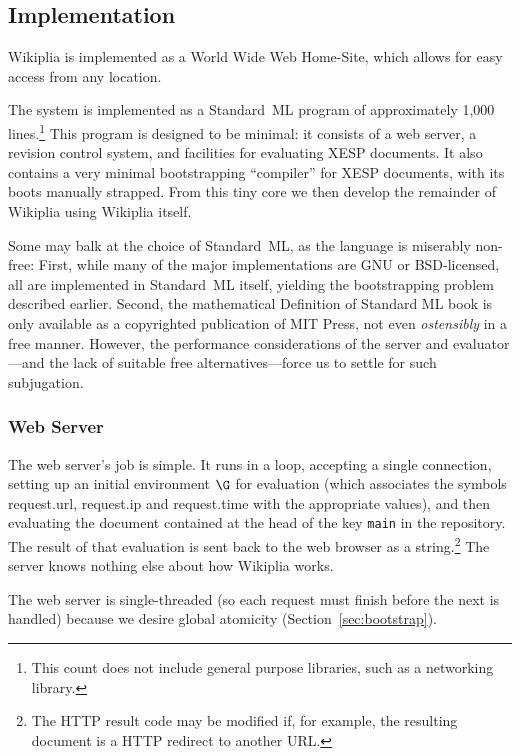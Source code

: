 \documentclass[twocolumn]{article}
\begin{document}
\subsection{Implementation}

Wikiplia is implemented as a World Wide Web Home-Site, which allows
for easy access from any location.

The system is implemented as a Standard~ML program
of approximately 1,000 lines.\z\footnote{This count does not include
general purpose libraries, such as a networking library.} This program
is designed to be minimal: it consists of a web server, a revision
control system, and facilities for evaluating XESP documents. It also
contains a very minimal bootstrapping ``compiler'' for XESP documents,
with its boots manually strapped. From this tiny core we then develop
the remainder of Wikiplia using Wikiplia itself.

Some may balk at the choice of Standard~ML, as the language is
miserably non-free: First, while many of the major implementations are
GNU or BSD-licensed,\z{} all are implemented in
Standard~ML itself, yielding the bootstrapping problem described
earlier. Second, the mathematical Definition of Standard ML book is
only available as a copyrighted publication of MIT
Press,\z{} not even {\em ostensibly} in a free
manner. However, the performance considerations of the server and
evaluator---and the lack of suitable free alternatives---force us to
settle for such subjugation.

\subsubsection{Web Server}

The web server's job is simple. It runs in a loop, accepting a single
connection, setting up an initial environment $\G$ for evaluation
(which associates the symbols {\sf request.url}, {\sf request.ip} and
{\sf request.time} with the appropriate values), and then evaluating
the document contained at the head of the key {\tt main} in the
repository. The result of that evaluation is sent back to the web
browser as a string.\z\footnote{The HTTP result code may be modified
if, for example, the resulting document is a HTTP redirect to another
URL.} The server knows nothing else about how Wikiplia works.

The web server is single-threaded (so each request must finish
before the next is handled) because we desire global atomicity
(Section~\ref{sec:bootstrap}).
\end{document}
